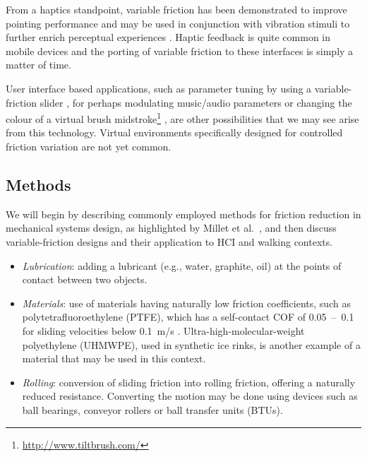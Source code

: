\documentclass [12pt,letterpaper]{report}
\begin{document}
From a haptics standpoint, variable friction has been demonstrated to improve pointing performance \cite{akamatsu1996movement,dennerlein2000force,cockburn2005multimodal,levesque2011enhancing} and may be used in conjunction with vibration stimuli to further enrich perceptual experiences \cite{millet2016design}. Haptic feedback is quite common in mobile devices and the porting of variable friction to these interfaces is simply a matter of time.

User interface based applications, such as parameter tuning by using a variable-friction slider \cite{visell2010contact}, for perhaps modulating music/audio parameters or changing the colour of a virtual brush midstroke\footnote{\url{http://www.tiltbrush.com/}} \cite{velloso2015interactions}, are other possibilities that we may see arise from this technology. Virtual environments specifically designed for controlled friction variation are not yet common.


\subsection{Methods}

We will begin by describing commonly employed methods for friction reduction in mechanical systems design, as highlighted by Millet et al.\ \cite{millet2016design}, and then discuss variable-friction designs and their application to HCI and walking contexts.


\begin{itemize}

	\item \textit{Lubrication}: adding a lubricant (e.g., water, graphite, oil) at the points of contact between two objects.

	\item \textit{Materials}: use of materials having naturally low friction coefficients, such as polytetrafluoroethylene (PTFE), which has a self-contact COF of 0.05~--~0.1 for sliding velocities below 0.1~m/s \cite{Dupont1996}. Ultra-high-molecular-weight polyethylene (UHMWPE), used in synthetic ice rinks, is another example of a material that may be used in this context. %

	\item \textit{Rolling}: conversion of sliding friction into rolling friction, offering a naturally reduced resistance. Converting the motion may be done using devices such as ball bearings, conveyor rollers or ball transfer units (BTUs).
		
\end{itemize}
\end{document}
